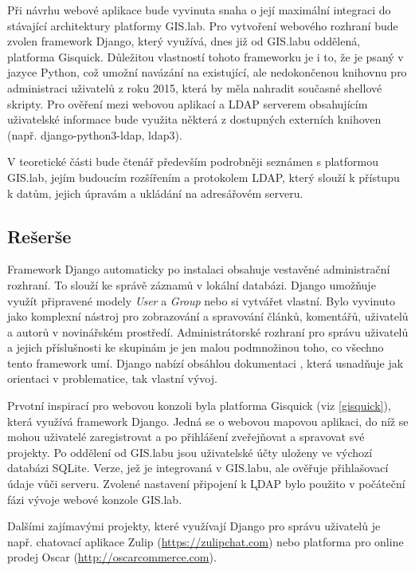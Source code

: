 
Při návrhu webové aplikace bude vyvinuta snaha o její maximální
integraci do stávající architektury platformy GIS.lab. Pro vytvoření
webového rozhraní bude zvolen framework Django, který využívá, dnes již
od GIS.labu oddělená, platforma Gisquick. Důležitou vlastností tohoto
frameworku je i to, že je psaný v jazyce Python, což umožní navázání
na existující, ale nedokončenou knihovnu pro administraci uživatelů z
roku 2015, která by měla nahradit současné shellové skripty. Pro
ověření mezi webovou aplikací a LDAP serverem obsahujícím uživatelské
informace bude využita některá z dostupných externích knihoven
(např. django-python3-ldap, ldap3).

V teoretické části bude čtenář především podrobněji seznámen s
platformou GIS.lab, jejím budoucím rozšířením a protokolem LDAP, 
který slouží k přístupu k datům, jejich úpravám a ukládání na 
adresářovém serveru.

\newpage
\subsection*{Rešerše}

Framework Django automaticky po instalaci obsahuje vestavěné
administrační roz\-hraní. To slouží ke správě záznamů v lokální
databázi. Django umožňuje využít připravené modely \textit{User} a
\textit{Group} nebo si vytvářet vlastní. Bylo vyvinuto jako komplexní
nástroj pro zobrazování a spravování článků, komentářů, uživatelů a
autorů v novinářském prostředí. Administrátorské rozhraní pro správu
uživatelů a jejich příslušnosti ke skupinám je jen malou podmnožinou
toho, co všechno tento framework umí. Django nabízí obsáhlou
dokumentaci \cite{django-doc}, která usnadňuje jak orientaci v
problematice, tak vlastní vývoj.

Prvotní inspirací pro webovou konzoli byla platforma Gisquick (viz
\ref{gisquick}), která využívá framework Django. Jedná se o webovou
mapovou aplikaci, do níž se mohou uživatelé zaregistrovat a po
přihlášení zveřejňovat a spravovat své projekty. Po oddělení od
GIS.labu jsou uživatelské účty uloženy ve výchozí databázi
SQLite. Verze, jež je integrovaná v GIS.labu, ale ověřuje přihlašovací
údaje vůči  serveru. Zvolené nastavení připojení k \k{LDAP}
bylo použito v počáteční fázi vývoje webové konzole GIS.lab.

Dalšími zajímavými projekty, které využívají Django pro správu
uživatelů je např. chatovací aplikace Zulip
(\href{https://zulipchat.com}{https://zulipchat.com}) nebo platforma
pro online prodej Oscar
(\href{http://oscarcommerce.com}{http://oscarcommerce.com}).

